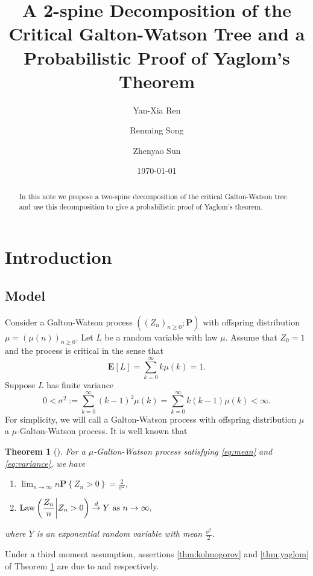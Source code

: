 \documentclass[12pt]{amsart}
\title[A 2-spine decomposition and Yaglom's theorem]
{\large A 2-spine Decomposition of the Critical Galton-Watson Tree and a Probabilistic Proof of Yaglom's Theorem}
\author{Yan-Xia Ren}
\author{Renming Song}
\author{Zhenyao Sun}
\date{\today}
\newtheorem{thm}{Theorem}[section]
\numberwithin{equation}{section}
\newcommand{\expr}[1]{\left( #1 \right)}
\newcommand{\set}[1]{\left\{ #1 \right\}}
\newcommand{\law}{\text{\rm Law}}
\newcommand{\tolaw}{\stackrel{d}{\to}}
\newcommand{\expct}{\mathbf E}
\newcommand{\bP}{\mathbf P}\newcommand{\bbP}{\mathbb P}\newcommand{\cP}{\mathcal P}
\begin{document}
\begin{abstract}
	In this note  we propose a two-spine decomposition of the critical
		Galton-Watson
	tree and use this decomposition to give a probabilistic proof of Yaglom's theorem.
\end{abstract}
	\maketitle	
\section{Introduction}
\subsection{Model}
\label{sec:model}
	Consider a Galton-Watson process $((Z_n)_{n\ge0}; \bP )$ with offspring distribution $\mu=(\mu(n))_{n\ge 0}$.
	Let $L$ be a random variable with law $\mu$. Assume that $Z_0=1$ and the process is critical in the sense that
\begin{equation}
\label{eq:mean}
		\expct [L]
	=
		\sum_{k=0}^\infty k \mu(k)
	=
		1.
\end{equation}
	Suppose $L$ has finite variance
\begin{equation}
\label{eq:variance}
		0	
	<	
		\sigma^2
	:=
		\sum_{k=0}^\infty  (k-1)^2 \mu(k)
	=
		\sum_{k=0}^\infty k(k-1) \mu(k)
	<
		\infty.
\end{equation}
For simplicity, we will call a Galton-Watson process with offspring distribution $\mu$
a $\mu$-Galton-Watson process. 	It is well known that
\begin{thm}[\cite{kesten1966galton}]
\label{thm:kesten}
For a $\mu$-Galton-Watson process satisfying \eqref{eq:mean} and \eqref{eq:variance}, we have
\begin{enumerate}
\item
\label{thm:kolmogorov}
	$\displaystyle \lim_{n \to \infty} n \bP \set{Z_n>0} = \frac{2}{\sigma^2},$ 
\item
\label{thm:yaglom}
	$\displaystyle	\law\expr{\frac{Z_n}{n}\bigg| Z_n>0}\tolaw Y \ \text{as }n\to\infty,$
\end{enumerate}
	where $Y$ is an exponential random variable with mean $\frac{\sigma^2}{2}$.
\end{thm}
\par
	Under a third moment assumption, assertions \eqref{thm:kolmogorov} and \eqref{thm:yaglom} of Theorem \ref{thm:kesten} are due to \cite{kolmogorov1938losung} and \cite{yaglom1947certain} respectively.
\end{document}
